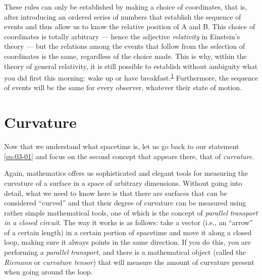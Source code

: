 These rules can only be established by making a choice of
coordinates, that is, after introducing an ordered series of numbers
that establish the sequence of events and thus allow us to know the relative position of
A and B. This choice of coordinates is totally arbitrary --- hence the adjective
\emph{relativity} in Einstein's theory --- but the relations among the events that
follow from the selection of coordinates is the same, regardless of the choice made.
This is why, within the theory of general relativity, it is still possible to establish
without ambiguity what you did first this morning: wake up or have
breakfast.\textsuperscript{\hyperlink{note:03-01}{1}} Furthermore, the sequence of events will be the same for
every observer, whatever their state of motion.

\section{Curvature}\label{sec:03-curvature}

Now that we understand what spacetime is, let us go back to our statement \eqref{eq:03-01} and
focus on the second concept that appears there, that of
\emph{curvature}.

Again, mathematics offers us sophisticated and elegant tools for measuring the curvature
of a surface in a space of arbitrary dimensions. Without going into detail, what we need
to know here is that there are surfaces that can be considered ``curved'' and that their
degree of curvature can be measured using rather simple mathematical tools, one of which
is the concept of \emph{parallel transport} \emph{in a closed
circuit}. The way it works is as follows: take a vector (i.e., an
``arrow'' of a certain length) in a certain portion of spacetime and move it along a
closed loop, making sure it always points in the same direction. If you do this, you are
performing a \emph{parallel} \emph{transport}, and there is a
mathematical object (called the \emph{Riemann} or \emph{curvature}
\emph{tensor}) that will measure the amount of
curvature present when going around the loop.

